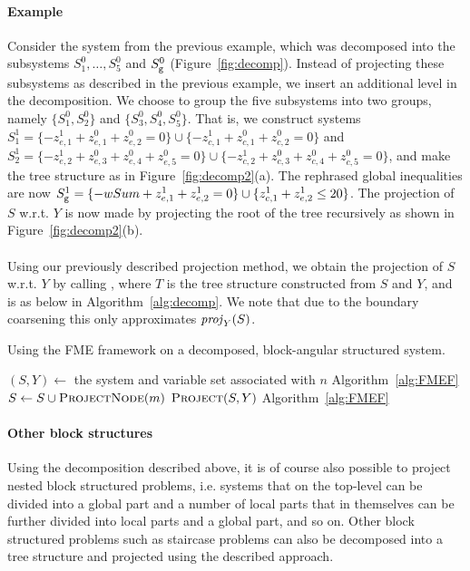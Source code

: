 \paragraph{Example}
Consider the system from the previous example, which was decomposed into the subsystems $S^0_1, \ldots, S^0_5$ and $S^0_{\texttt{g}}$ (Figure~\ref{fig:decomp}). Instead of projecting these subsystems as described in the previous example, we insert an additional level in the decomposition. We choose to group the five subsystems into two groups, namely $\{S^0_1, S^0_2\}$ and $\{S^0_3, S^0_4, S^0_5\}$. 
That is, we construct systems $S^1_1=\{-z^1_{e,1} + z^0_{e,1}+z^0_{e,2} = 0\}\cup \{-z^1_{c,1} + z^0_{c,1}+z^0_{c,2} = 0\}$ and $S^1_2=\{-z^1_{e,2} +z^0_{e,3}+ z^0_{e,4}+z^0_{e,5} = 0\}\cup \{-z^1_{c,2} +z^0_{c,3}+ z^0_{c,4}+z^0_{c,5} = 0\}$, and make the tree structure as in Figure~\ref{fig:decomp2}(a). The rephrased global inequalities are now $S_{\texttt{g}}^1 = \{-wSum + z^1_{e,1} + z^1_{e,2} = 0 \} \cup \{ z^1_{c,1} + z^1_{e,2} \leq 20\}$.   
%
The projection of $S$ w.r.t. $Y$ is now made by projecting the root of the tree recursively as shown in Figure~\ref{fig:decomp2}(b). 
\\
\\
Using our previously described projection method, we obtain the projection of $S$ w.r.t. $Y$ by calling , where $T$ is the tree structure constructed from $S$ and $Y$, and  is as below in Algorithm~\ref{alg:decomp}. We note that due to the boundary coarsening this only approximates $\mathit{proj}_Y(S)$.

\begin{algorithm}
\caption{{Using the FME framework on a decomposed, block-angular structured system.}}
\label{alg:decomp}
\begin{algorithmic}
	\State $(S,Y)\gets$ the system and variable set associated with $n$
		\State \Return {}\Comment Algorithm~\ref{alg:FMEF}
	\Else
			\State $S \gets S\cup \Call{ProjectNode}{m}$ 
		\EndFor
		\State \Return $\Call{Project}{S, Y}$ \Comment Algorithm~\ref{alg:FMEF}
	\EndIf
\EndFunction
\end{algorithmic}
\end{algorithm}

\paragraph{Other block structures} 
Using the decomposition described above, it is of course also possible to project nested block structured problems, i.e. systems that on the top-level can be divided into a global part and a number of local parts that in themselves can be further divided into local parts and a global part, and so on.  
Other block structured problems such as staircase problems can also be decomposed into a tree structure and projected using the described approach. 

